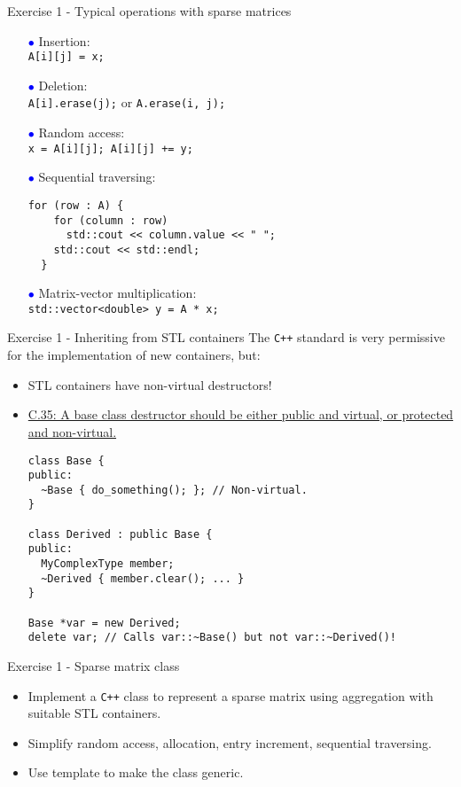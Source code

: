 \documentclass[10pt,aspectratio=169]{beamer}
\begin{document}
\begin{frame}[fragile]{Exercise 1 - Typical operations with sparse matrices} 
\begin{itemize}
\item[\textcolor{blue}{$\bullet$}] Insertion: \\
\lstinline|A[i][j] = x;|
\item[\textcolor{blue}{$\bullet$}] Deletion: \\
\lstinline|A[i].erase(j);| or \lstinline|A.erase(i, j);|
\item[\textcolor{blue}{$\bullet$}] Random access: \\
\lstinline|x = A[i][j]; A[i][j] += y;|
\item[\textcolor{blue}{$\bullet$}] Sequential traversing:
\small\begin{lstlisting}
for (row : A) {
    for (column : row)
      std::cout << column.value << " ";
    std::cout << std::endl;
  }
\end{lstlisting}\normalsize
\item[\textcolor{blue}{$\bullet$}] Matrix-vector multiplication:\\
\lstinline|std::vector<double> y = A * x;|
\end{itemize}
\end{frame}

\begin{frame}[fragile]{Exercise 1 - Inheriting from STL containers}
The \texttt{C++} standard is very permissive for the implementation of new containers, but:
\begin{itemize}
\item STL containers have non-virtual destructors!
\item \href{http://isocpp.github.io/CppCoreGuidelines/CppCoreGuidelines\#Rc-dtor-virtual}{C.35: A base class destructor should be either public and virtual, or protected and non-virtual.}
\small\begin{lstlisting}
class Base {
public:
  ~Base { do_something(); }; // Non-virtual.
}

class Derived : public Base {
public:
  MyComplexType member;
  ~Derived { member.clear(); ... }
}

Base *var = new Derived;
delete var; // Calls var::~Base() but not var::~Derived()!
\end{lstlisting}\normalsize
\end{itemize}
\end{frame}


\begin{frame}[fragile]{Exercise 1 - Sparse matrix class}
\begin{itemize}
\item Implement a \texttt{C++} class to represent a sparse matrix using aggregation with suitable STL containers.
\item Simplify random access, allocation, entry increment, sequential traversing.
\item Use template to make the class generic.
\end{itemize}
\end{frame}
\end{document}
